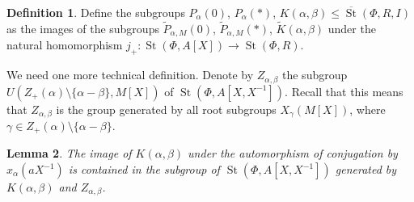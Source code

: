 \documentclass[10pt,a4paper,twoside]{article}
\newtheorem{lemma}{Lemma}
\theoremstyle{remark}
\theoremstyle{definition}
\numberwithin{lemma}{section}
\numberwithin{prop}{section}
\numberwithin{corollary}{section}
\numberwithin{externaltheorem}{section}
\newtheorem{df}[lemma]{Definition} \Crefname{df}{Definition}{Definitions}
\DeclareMathOperator{\St}{St}
\numberwithin{equation}{section}
\begin{document}
\begin{df} Define the subgroups $P_\alpha(0)$, $P_{\alpha}(*)$, $K(\alpha, \beta) \leq \overline{\St}(\Phi, R, I)$ as the images of the subgroups $\widetilde{P}_{\alpha, M}(0)$, $\widetilde{P}_{\alpha, M}(*)$, $\widetilde{K}(\alpha, \beta)$ under the natural homomorphism $j_+ \colon \St(\Phi, A[X]) \to \St(\Phi, R)$.\end{df}

We need one more technical definition. Denote by $Z_{\alpha, \beta}$ the subgroup $U(Z_+(\alpha) \setminus \{\alpha - \beta \}, M[X])$ of $\St(\Phi, A[X, X^{-1}])$.  Recall that this means that $Z_{\alpha, \beta}$ is the group generated by all root subgroups $X_\gamma(M[X])$, where $\gamma \in Z_+(\alpha) \setminus \{ \alpha - \beta \}$. 
  
\begin{lemma} \label{image-K-a-b} The image of $K(\alpha, \beta)$ under the automorphism of conjugation by $x_\alpha(aX^{-1})$ is contained in the subgroup of $\St(\Phi, A[X, X^{-1}])$ generated by $K(\alpha, \beta)$ and $Z_{\alpha, \beta}$. \end{lemma}
\end{document}
